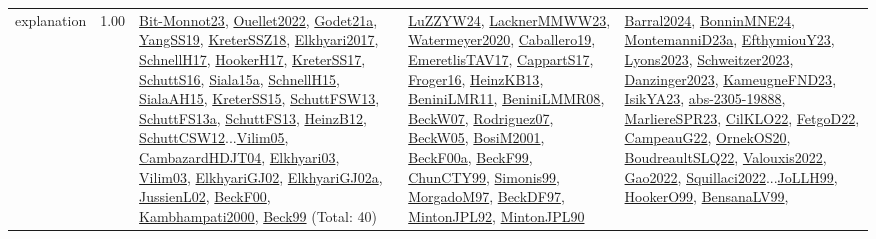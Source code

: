 {\begin{longtable}{p{3cm}r>{\raggedright\arraybackslash}p{6cm}>{\raggedright\arraybackslash}p{6cm}>{\raggedright\arraybackslash}p{8cm}}
\index{explanation}\index{Concepts!explanation}explanation &  1.00 & \hyperref[detail:Bit-Monnot23]{Bit-Monnot23}, \hyperref[detail:Ouellet2022]{Ouellet2022}, \hyperref[detail:Godet21a]{Godet21a}, \hyperref[detail:YangSS19]{YangSS19}, \hyperref[detail:KreterSSZ18]{KreterSSZ18}, \hyperref[detail:Elkhyari2017]{Elkhyari2017}, \hyperref[detail:SchnellH17]{SchnellH17}, \hyperref[detail:HookerH17]{HookerH17}, \hyperref[detail:KreterSS17]{KreterSS17}, \hyperref[detail:SchuttS16]{SchuttS16}, \hyperref[detail:Siala15a]{Siala15a}, \hyperref[detail:SchnellH15]{SchnellH15}, \hyperref[detail:SialaAH15]{SialaAH15}, \hyperref[detail:KreterSS15]{KreterSS15}, \hyperref[detail:SchuttFSW13]{SchuttFSW13}, \hyperref[detail:SchuttFS13a]{SchuttFS13a}, \hyperref[detail:SchuttFS13]{SchuttFS13}, \hyperref[detail:HeinzB12]{HeinzB12}, \hyperref[detail:SchuttCSW12]{SchuttCSW12}...\hyperref[detail:Vilim05]{Vilim05}, \hyperref[detail:CambazardHDJT04]{CambazardHDJT04}, \hyperref[detail:Elkhyari03]{Elkhyari03}, \hyperref[detail:Vilim03]{Vilim03}, \hyperref[detail:ElkhyariGJ02]{ElkhyariGJ02}, \hyperref[detail:ElkhyariGJ02a]{ElkhyariGJ02a}, \hyperref[detail:JussienL02]{JussienL02}, \hyperref[detail:BeckF00]{BeckF00}, \hyperref[detail:Kambhampati2000]{Kambhampati2000}, \hyperref[detail:Beck99]{Beck99} (Total: 40) & \hyperref[detail:LuZZYW24]{LuZZYW24}, \hyperref[detail:LacknerMMWW23]{LacknerMMWW23}, \hyperref[detail:Watermeyer2020]{Watermeyer2020}, \hyperref[detail:Caballero19]{Caballero19}, \hyperref[detail:EmeretlisTAV17]{EmeretlisTAV17}, \hyperref[detail:CappartS17]{CappartS17}, \hyperref[detail:Froger16]{Froger16}, \hyperref[detail:HeinzKB13]{HeinzKB13}, \hyperref[detail:BeniniLMR11]{BeniniLMR11}, \hyperref[detail:BeniniLMMR08]{BeniniLMMR08}, \hyperref[detail:BeckW07]{BeckW07}, \hyperref[detail:Rodriguez07]{Rodriguez07}, \hyperref[detail:BeckW05]{BeckW05}, \hyperref[detail:BosiM2001]{BosiM2001}, \hyperref[detail:BeckF00a]{BeckF00a}, \hyperref[detail:BeckF99]{BeckF99}, \hyperref[detail:ChunCTY99]{ChunCTY99}, \hyperref[detail:Simonis99]{Simonis99}, \hyperref[detail:MorgadoM97]{MorgadoM97}, \hyperref[detail:BeckDF97]{BeckDF97}, \hyperref[detail:MintonJPL92]{MintonJPL92}, \hyperref[detail:MintonJPL90]{MintonJPL90} & \hyperref[detail:Barral2024]{Barral2024}, \hyperref[detail:BonninMNE24]{BonninMNE24}, \hyperref[detail:MontemanniD23a]{MontemanniD23a}, \hyperref[detail:EfthymiouY23]{EfthymiouY23}, \hyperref[detail:Lyons2023]{Lyons2023}, \hyperref[detail:Schweitzer2023]{Schweitzer2023}, \hyperref[detail:Danzinger2023]{Danzinger2023}, \hyperref[detail:KameugneFND23]{KameugneFND23}, \hyperref[detail:IsikYA23]{IsikYA23}, \hyperref[detail:abs-2305-19888]{abs-2305-19888}, \hyperref[detail:MarliereSPR23]{MarliereSPR23}, \hyperref[detail:CilKLO22]{CilKLO22}, \hyperref[detail:FetgoD22]{FetgoD22}, \hyperref[detail:CampeauG22]{CampeauG22}, \hyperref[detail:OrnekOS20]{OrnekOS20}, \hyperref[detail:BoudreaultSLQ22]{BoudreaultSLQ22}, \hyperref[detail:Valouxis2022]{Valouxis2022}, \hyperref[detail:Gao2022]{Gao2022}, \hyperref[detail:Squillaci2022]{Squillaci2022}...\hyperref[detail:JoLLH99]{JoLLH99}, \hyperref[detail:HookerO99]{HookerO99}, \hyperref[detail:BensanaLV99]{BensanaLV99}, 
\end{longtable}}
